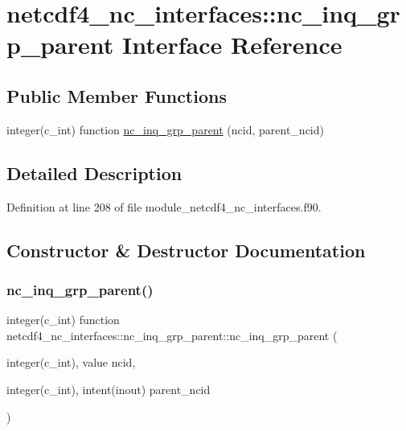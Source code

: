 \hypertarget{interfacenetcdf4__nc__interfaces_1_1nc__inq__grp__parent}{}\section{netcdf4\+\_\+nc\+\_\+interfaces\+:\+:nc\+\_\+inq\+\_\+grp\+\_\+parent Interface Reference}
\label{interfacenetcdf4__nc__interfaces_1_1nc__inq__grp__parent}
\subsection*{Public Member Functions}
\begin{DoxyCompactItemize}
\item 
integer(c\+\_\+int) function \hyperlink{interfacenetcdf4__nc__interfaces_1_1nc__inq__grp__parent_aad1887e34979707180805c24f0337773}{nc\+\_\+inq\+\_\+grp\+\_\+parent} (ncid, parent\+\_\+ncid)
\end{DoxyCompactItemize}


\subsection{Detailed Description}


Definition at line 208 of file module\+\_\+netcdf4\+\_\+nc\+\_\+interfaces.\+f90.



\subsection{Constructor \& Destructor Documentation}
\mbox{\label{interfacenetcdf4__nc__interfaces_1_1nc__inq__grp__parent_aad1887e34979707180805c24f0337773}} 
\subsubsection{\texorpdfstring{nc\+\_\+inq\+\_\+grp\+\_\+parent()}{nc\_inq\_grp\_parent()}}
{\footnotesize\ttfamily integer(c\+\_\+int) function netcdf4\+\_\+nc\+\_\+interfaces\+::nc\+\_\+inq\+\_\+grp\+\_\+parent\+::nc\+\_\+inq\+\_\+grp\+\_\+parent (\begin{DoxyParamCaption}\item[{integer(c\+\_\+int), value}]{ncid,  }\item[{integer(c\+\_\+int), intent(inout)}]{parent\+\_\+ncid }\end{DoxyParamCaption})}



